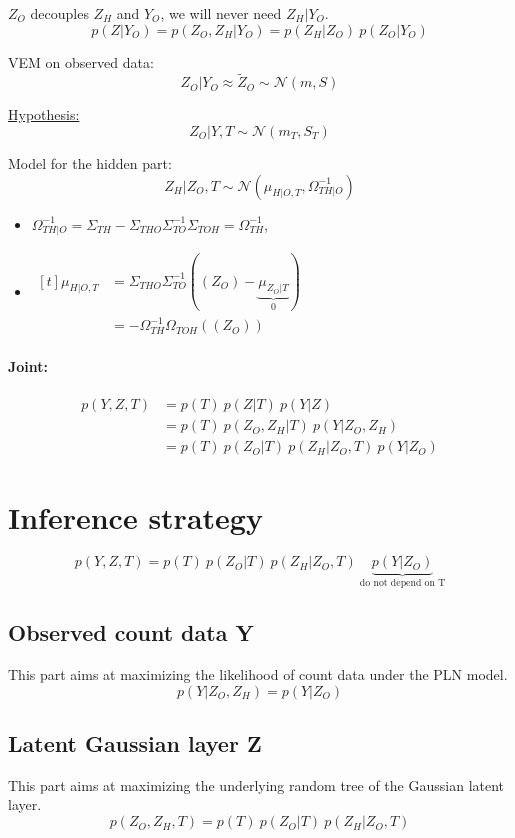 \documentclass[11pt,a4paper]{article}
\begin{document}
$Z_O$ decouples $Z_H$ and $Y_O$, we will never need $Z_H|Y_O$.
$$ p(Z|Y_O) = p(Z_O,Z_H | Y_O) = p(Z_H|Z_O) \: p(Z_O|Y_O) $$


VEM on observed data: $$Z_O|Y_O \approx \widetilde{Z}_O \sim \mathcal{N}(m,S)$$

\underline{ Hypothesis:}
$$ Z_O|Y,T \sim \mathcal{N}(m_T,S_T)$$

Model for the hidden part: $$Z_H|Z_O,T \sim \mathcal{N}(\mu_{H|O,T}, \Omega_{TH|O}^{-1})$$ 

\begin{itemize}
\item $\Omega_{TH|O}^{-1} = \Sigma_{TH} -\Sigma_{THO}\Sigma_{TO}^{-1}\Sigma_{TOH} = \Omega_{TH}^{-1}$, 

\item$ \displaystyle\begin{aligned}[t]
\mu_{H|O,T} &= \Sigma_{THO}\Sigma_{TO}^{-1}((Z_O)-\underbrace{\mu_{Z_O|T}}_{0}) \\
 &= -\Omega_{TH}^{-1}\Omega_{TOH}((Z_O))
\end{aligned}$\\
\end{itemize}


\paragraph{Joint:}
\begin{align*}
p(Y,Z,T)& = p(T) \: p(Z|T) \: p(Y|Z) \\
&= p(T)\: p(Z_O,Z_H|T) \: p(Y|Z_O,Z_H) \\
&= p(T) \: p(Z_O|T) \: p(Z_H | Z_O,T)  \: p(Y|Z_O)
\end{align*} 

\section{Inference strategy}
$$p(Y,Z,T)= p(T) \: p(Z_O|T) \: p(Z_H | Z_O,T)  \: \underbrace{p(Y|Z_O)}_{\text{do not depend on T}}$$
\subsection{Observed count data Y}
This part aims at maximizing the likelihood of count data under the PLN model. 
$$p(Y|Z_O,Z_H) = p(Y|Z_O)$$
\subsection{Latent Gaussian layer Z}
This part aims at maximizing the underlying random tree of the Gaussian latent layer.
$$p(Z_O,Z_H,T) = p(T) \: p(Z_O|T) \: p(Z_H | Z_O,T)$$
\end{document}
